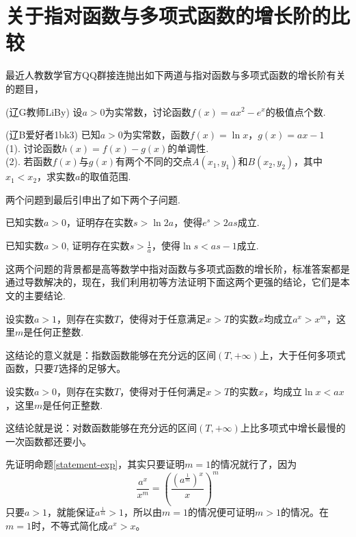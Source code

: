 
\section{关于指对函数与多项式函数的增长阶的比较}
\label{sec:exp-log-level}

最近人教数学官方QQ群接连抛出如下两道与指对函数与多项式函数的增长阶有关的题目，
\begin{exercise}
  (辽G教师LiBy) 设$a>0$为实常数，讨论函数$f(x)=ax^2-e^x$的极值点个数.
\end{exercise}

\begin{exercise}
  (辽B爱好者1bk3) 已知$a>0$为实常数，函数$f(x)=\ln{x}$，$g(x)=ax-1$ \\
  (1). 讨论函数$h(x)=f(x)-g(x)$的单调性. \\
  (2). 若函数$f(x)$与$g(x)$有两个不同的交点$A(x_1,y_1)$和$B(x_2,y_2)$，其中$x_1<x_2$，求实数$a$的取值范围.
\end{exercise}
两个问题到最后引申出了如下两个子问题.
\begin{topic}
  \label{topic-exp}
  已知实数$a>0$，证明存在实数$s>\ln{2a}$，使得$e^s>2as$成立.
\end{topic}

\begin{topic}
  \label{topic-log}
  已知实数$a>0$, 证明存在实数$s>\frac{1}{a}$，使得$\ln{s}<as-1$成立.
\end{topic}

这两个问题的背景都是高等数学中指对函数与多项式函数的增长阶，标准答案都是通过导数解决的，现在，我们利用初等方法证明下面这两个更强的结论，它们是本文的主要结论.
\begin{statement}
  \label{statement-exp}
  设实数$a>1$，则存在实数$T$，使得对于任意满足$x>T$的实数$x$均成立$a^x>x^m$，这里$m$是任何正整数.
\end{statement}
这结论的意义就是：指数函数能够在充分远的区间$(T,+\infty)$上，大于任何多项式函数，只要$T$选择的足够大。

\begin{statement}
  \label{statement-log}
  设实数$a>0$，则存在实数$T$，使得对于任何满足$x>T$的实数$x$，均成立$\ln{x}<ax$，这里$m$是任何正整数.
\end{statement}
这结论就是说：对数函数能够在充分远的区间$(T,+\infty)$上比多项式中增长最慢的一次函数都还要小。

先证明命题\ref{statement-exp}，其实只要证明$m=1$的情况就行了，因为
\[ \frac{a^x}{x^m} = \left( \frac{(a^{\frac{1}{m}})^x}{x} \right)^m \]
只要$a>1$，就能保证$a^{\frac{1}{m}}>1$，所以由$m=1$的情况便可证明$m>1$的情况。在$m=1$时，不等式简化成$a^x>x$。


